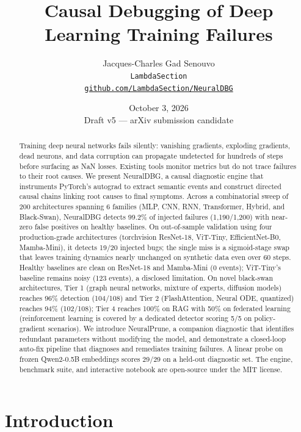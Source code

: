 \documentclass[11pt]{article}
\title{Causal Debugging of Deep Learning Training Failures}
\author{Jacques-Charles Gad Senouvo\\
\texttt{LambdaSection}\\
\texttt{\href{https://github.com/LambdaSection/NeuralDBG}{github.com/LambdaSection/NeuralDBG}}}
\date{October 3, 2026\\Draft v5 --- arXiv submission candidate}
\begin{document}
\maketitle

\begin{abstract}
Training deep neural networks fails silently: vanishing gradients, exploding gradients, dead neurons, and data corruption can propagate undetected for hundreds of steps before surfacing as NaN losses. Existing tools monitor metrics but do not trace failures to their root causes. We present NeuralDBG, a causal diagnostic engine that instruments PyTorch's autograd to extract semantic events and construct directed causal chains linking root causes to final symptoms. Across a combinatorial sweep of 200 architectures spanning 6 families (MLP, CNN, RNN, Transformer, Hybrid, and Black-Swan), NeuralDBG detects 99.2\% of injected failures (1,190/1,200) with near-zero false positives on healthy baselines. On out-of-sample validation using four production-grade architectures (torchvision ResNet-18, ViT-Tiny, EfficientNet-B0, Mamba-Mini), it detects 19/20 injected bugs; the single miss is a sigmoid-stage swap that leaves training dynamics nearly unchanged on synthetic data even over 60 steps. Healthy baselines are clean on ResNet-18 and Mamba-Mini (0 events); ViT-Tiny's baseline remains noisy (123 events), a disclosed limitation. On novel black-swan architectures, Tier 1 (graph neural networks, mixture of experts, diffusion models) reaches 96\% detection (104/108) and Tier 2 (FlashAttention, Neural ODE, quantized) reaches 94\% (102/108); Tier 4 reaches 100\% on RAG with 50\% on federated learning (reinforcement learning is covered by a dedicated detector scoring 5/5 on policy-gradient scenarios). We introduce NeuralPrune, a companion diagnostic that identifies redundant parameters without modifying the model, and demonstrate a closed-loop auto-fix pipeline that diagnoses and remediates training failures. A linear probe on frozen Qwen2-0.5B embeddings scores 29/29 on a held-out diagnostic set. The engine, benchmark suite, and interactive notebook are open-source under the MIT license.
\end{abstract}

\section{Introduction}
\end{document}
